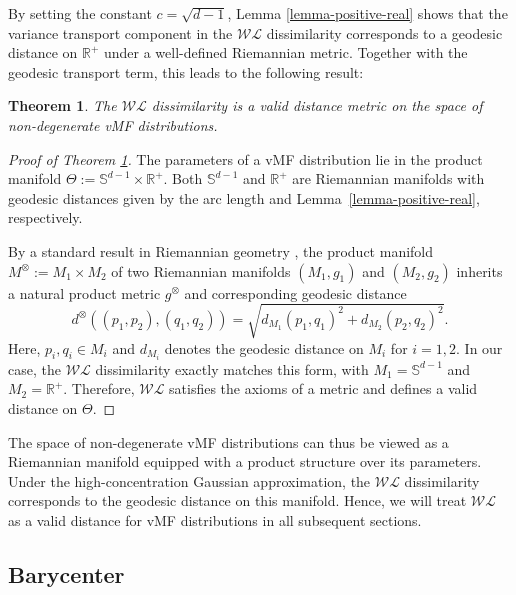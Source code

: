 \documentclass[10pt]{article}
\newtheorem{theorem}{Theorem}[section]
\newcommand{\bbS}{\mathbb{S}}
\newcommand{\bbRpos}{\mathbb{R}^+}
\newcommand{\WL}{\mathcal{WL}}
\begin{document}
By setting the constant $c = \sqrt{d-1}$, Lemma \ref{lemma-positive-real} shows that the variance transport component in the $\WL$ dissimilarity corresponds to a geodesic distance on $\bbRpos$ under a well-defined Riemannian metric. Together with the geodesic transport term, this leads to the following result:


\begin{theorem}\label{theorem-metric}
	The $\WL$ dissimilarity is a valid distance metric on the space of non-degenerate vMF distributions.
\end{theorem}
\begin{proof}[Proof of Theorem \ref{theorem-metric}]
The parameters of a vMF distribution lie in the product manifold $\Theta := \bbS^{d-1} \times \bbRpos$. Both $\bbS^{d-1}$ and $\bbRpos$ are Riemannian manifolds with geodesic distances given by the arc length and Lemma~\ref{lemma-positive-real}, respectively.

By a standard result in Riemannian geometry \citep{lee_1997_RiemannianManifoldsIntroduction}, the product manifold $M^\otimes := M_1 \times M_2$ of two Riemannian manifolds $(M_1, g_1)$ and $(M_2, g_2)$ inherits a natural product metric $g^\otimes$ and corresponding geodesic distance \begin{equation}\label{eq-geodesic-distance-on-product-manifold} d^\otimes((p_1, p_2), (q_1, q_2)) = \sqrt{d_{M_1}(p_1, q_1)^2 + d_{M_2}(p_2, q_2)^2}. \end{equation} Here, $p_i, q_i \in M_i$ and $d_{M_i}$ denotes the geodesic distance on $M_i$ for $i=1,2$. In our case, the $\WL$ dissimilarity exactly matches this form, with $M_1 = \bbS^{d-1}$ and $M_2 = \bbRpos$. Therefore, $\WL$ satisfies the axioms of a metric and defines a valid distance on $\Theta$.
\end{proof}



The space of non-degenerate vMF distributions can thus be viewed as a Riemannian manifold equipped with a product structure over its parameters. Under the high-concentration Gaussian approximation, the $\WL$ dissimilarity corresponds to the geodesic distance on this manifold. Hence, we will treat $\WL$ as a valid distance for vMF distributions in all subsequent sections.


\subsection{Barycenter}
\end{document}

